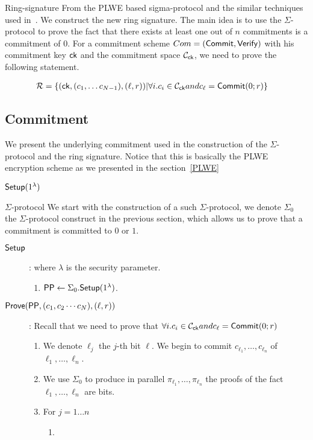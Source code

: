 \begin{section}{Ring-signature}
  From the PLWE based sigma-protocol and
  the similar techniques used in~\cite{DBLP:conf/eurocrypt/GrothK15}.
  We construct the new ring signature.
  The main idea is to use the $\Sigma$-protocol to prove the fact that
  there exists at least one out of $n$ commitments is a commitment of $0$.
  For a commitment scheme $Com = ({\mathsf{Commit}}, {\mathsf{Verify}})$ with his commitment key $\mathsf{ck}$
  and the commitment space $\mathcal{C}_{\mathsf{ck}}$,
  we need to prove the following statement.

  \begin{align*}
    \mathcal{R} &= \{(\mathsf{ck}, (c_1, \dots c_{N-1}), (\ell, r)) | \forall i. c_i \in \mathcal{C}_{\mathsf{ck}} and c_\ell = {\mathsf{Commit}}(0; r)\}
  \end{align*}


  \subsection{Commitment}
  We present the underlying commitment used in the construction of the $\Sigma$-protocol
  and the ring signature.
  Notice that this is basically the PLWE encryption scheme as we presented in the section~\ref{PLWE}
  \begin{description}
    \item [${\mathsf{Setup}}(1^\lambda)$]
  \end{description}

  \begin{subsection}{$\Sigma$-protocol}
  We start with the construction of a such $\Sigma$-protocol,
    we denote $\Sigma_0$ the $\Sigma$-protocol construct in the previous section,
    which allows us to prove that a commitment is committed to $0$ or $1$.
    \begin{description}
      \item[${\mathsf{Setup}}$]: where $\lambda$ is the security parameter.
        \begin{enumerate}
          \item ${\mathsf{PP}} \gets \Sigma_0.{\mathsf{Setup}}(1^\lambda)$.
        \end{enumerate}
        \item[${\mathsf{Prove}}({\mathsf{PP}}, (c_1, c_2 \cdots c_N), (\ell, r))$]:
        Recall that we need to prove that $\forall i. c_i \in \mathcal{C}_{\mathsf{ck}} and c_\ell = {\mathsf{Commit}}(0; r)$
        \begin{enumerate}
          \item We denote $\ell_j$ the $j$-th bit $\ell$. We begin to commit $c_{\ell_1}, \dots, c_{\ell_n}$ of $\ell_1, \dots, \ell_n$.
          \item We use $\Sigma_0$ to produce in parallel $\pi_{\ell_1}, \dots, \pi_{\ell_n}$ the proofs of the fact $\ell_1, \dots, \ell_n$ are bits.
          \item For $j = 1 \dots n$
          \begin{enumerate}
          \item
          \end{enumerate}


\end{enumerate}
\end{description}
\end{subsection}
\end{section}
